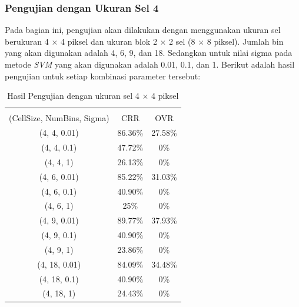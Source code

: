 \subsubsection{Pengujian dengan Ukuran Sel 4}
Pada bagian ini, pengujian akan dilakukan dengan menggunakan ukuran sel berukuran 4 $\times$ 4 piksel dan ukuran blok 2 $\times$ 2 sel (8 $\times$ 8 piksel). Jumlah bin yang akan digunakan adalah 4, 6, 9, dan 18. Sedangkan untuk nilai sigma pada metode \textit{SVM} yang akan digunakan adalah 0.01, 0.1, dan 1. Berikut adalah hasil pengujian untuk setiap kombinasi parameter tersebut:
\begin{longtable}[c]{|c|c|c|}
	\caption{Hasil Pengujian dengan ukuran sel 4 $\times$ 4 piksel}
	\label{tab:HasilPengujianSel4}\\
	\hline
	\begin{tabular}[c]{@{}c@{}}Parameter\\ (CellSize, NumBins, Sigma)\end{tabular} & CRR     & OVR     \\ \hline
	\endhead
	(4, 4, 0.01)                                                                   & 86.36\% & 27.58\% \\ \hline
	(4, 4, 0.1)                                                                    & 47.72\% & 0\%     \\ \hline
	(4, 4, 1)                                                                      & 26.13\% & 0\%     \\ \hline
	(4, 6, 0.01)                                                                   & 85.22\% & 31.03\%  \\ \hline
	(4, 6, 0.1)                                                                    & 40.90\% & 0\%     \\ \hline
	(4, 6, 1)                                                                      & 25\%    & 0\%     \\ \hline
	(4, 9, 0.01)                                                                   & {\color[HTML]{FE0000} 89.77\%} & {\color[HTML]{FE0000} 37.93\%}  \\ \hline
	(4, 9, 0.1)                                                                    & 40.90\% & 0\%     \\ \hline
	(4, 9, 1)                                                                      & 23.86\% & 0\%     \\ \hline
	(4, 18, 0.01)                                                                  & 84.09\% & 34.48\%  \\ \hline
	(4, 18, 0.1)                                                                   & 40.90\% & 0\%     \\ \hline
	(4, 18, 1)                                                                     & 24.43\% & 0\%     \\ \hline
\end{longtable}
